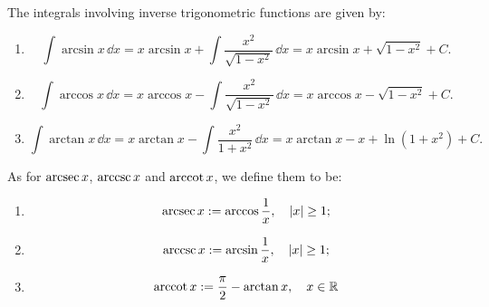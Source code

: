 \documentclass[a4paper]{ctexart}
\begin{document}
    \begin{mythm}
        The integrals involving inverse trigonometric functions are given by:
        \begin{enumerate}
            \item [(1)]
            \[
            \int \arcsin x\, \dd x = x \arcsin x + \int \frac{x^2}{\sqrt{1-x^2}}\, \dd x = x \arcsin x + \sqrt{1-x^2} + C.
            \]
            \item [(2)]
            \[
            \int \arccos x\, \dd x = x \arccos x - \int \frac{x^2}{\sqrt{1-x^2}}\, \dd x = x \arccos x - \sqrt{1-x^2} + C.
            \]
            \item [(3)]
            \[
            \int \arctan x\, \dd x = x \arctan x - \int \frac{x^2}{1+x^2}\, \dd x = x \arctan x - x + \ln(1+x^2) + C.
            \]
        \end{enumerate}
    \end{mythm}
    \begin{myrmk}
        As for $\arcsec x$, $\arccsc x$ and $\arccot x$, we define them to be:
        \begin{enumerate}
            \item $$ \arcsec x := \arccos \dfrac{1}{x},\quad |x| \geq 1; $$
            \item $$ \arccsc x := \arcsin \dfrac{1}{x},\quad |x| \geq 1; $$
            \item $$ \arccot x := \dfrac{\pi}{2}-\arctan x,\quad x\in\mathbb{R}$$
        \end{enumerate}
    \end{myrmk}
\end{document}
